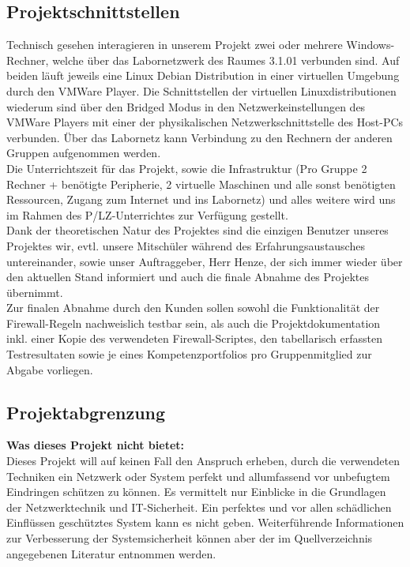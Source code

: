 \subsection{Projektschnittstellen} 
\label{sec:Projektschnittstellen}
    Technisch gesehen interagieren in unserem Projekt zwei oder mehrere Windows-Rechner, welche über das Labornetzwerk des Raumes 3.1.01 verbunden sind. Auf beiden läuft jeweils eine Linux Debian Distribution in einer virtuellen Umgebung durch den VMWare Player. Die Schnittstellen der virtuellen Linuxdistributionen wiederum sind über den Bridged Modus in den Netzwerkeinstellungen des VMWare Players mit einer der physikalischen Netzwerkschnittstelle des Host-PCs verbunden. Über das Labornetz kann Verbindung zu den Rechnern der anderen Gruppen aufgenommen werden.\\
    Die Unterrichtszeit für das Projekt, sowie die Infrastruktur (Pro Gruppe 2 Rechner + benötigte Peripherie, 2 virtuelle Maschinen und alle sonst benötigten Ressourcen, Zugang zum Internet und ins Labornetz) und alles weitere wird uns im Rahmen des P/LZ-Unterrichtes zur Verfügung gestellt.\\
    Dank der theoretischen Natur des Projektes sind die einzigen Benutzer unseres Projektes wir, evtl. unsere Mitschüler während des Erfahrungsaustausches untereinander, sowie unser Auftraggeber, Herr Henze, der sich immer wieder über den aktuellen Stand informiert und auch die finale Abnahme des Projektes übernimmt.\\ 
    Zur finalen Abnahme durch den Kunden sollen sowohl die Funktionalität der Firewall-Regeln nachweislich testbar sein, als auch die Projektdokumentation inkl. einer Kopie des verwendeten Firewall-Scriptes, den tabellarisch erfassten Testresultaten sowie je eines Kompetenzportfolios pro Gruppenmitglied zur Abgabe vorliegen.

\subsection{Projektabgrenzung} 
\label{sec:Projektabgrenzung}
	\textbf{Was dieses Projekt nicht bietet:}\\
    Dieses Projekt will auf keinen Fall den Anspruch erheben, durch die verwendeten Techniken ein Netzwerk oder System perfekt und allumfassend vor unbefugtem Eindringen schützen zu können. Es vermittelt nur Einblicke in die Grundlagen der Netzwerktechnik und IT-Sicherheit. Ein perfektes und vor allen schädlichen Einflüssen geschütztes System kann es nicht geben. Weiterführende Informationen zur Verbesserung der Systemsicherheit können aber der im Quellverzeichnis angegebenen Literatur entnommen werden.